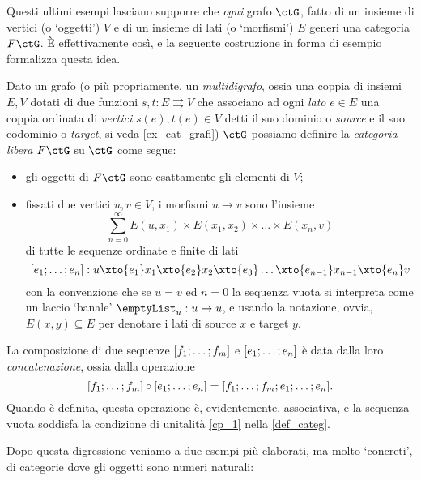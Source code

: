 Questi ultimi esempi lasciano supporre che \emph{ogni} grafo \(\ctG\), fatto di un insieme di vertici (o `oggetti') \(V\) e di un insieme di lati (o `morfismi') \(E\) generi una categoria \(F\ctG\). \`E effettivamente così, e la seguente costruzione in forma di esempio formalizza questa idea.
\begin{example}\label{ex_cat_libera}
	Dato un grafo (o più propriamente, un \emph{multidigrafo}, ossia una coppia di insiemi \(E,V\) dotati di due funzioni \(s,t : E\rightrightarrows V\) che associano ad ogni \emph{lato} \(e\in E\) una coppia ordinata di \emph{vertici} \(s(e),t(e)\in V\) detti il suo dominio o \emph{source} e il suo codominio o \emph{target}, si veda \ref{ex_cat_grafi}) \(\ctG\) possiamo definire la \emph{categoria libera} \(F\ctG\) su \(\ctG\) come segue:
	\begin{itemize}
		\item gli oggetti di \(F\ctG\) sono esattamente gli elementi di \(V\);
		\item fissati due vertici \(u,v\in V\), i morfismi \(u\to v\) sono l'insieme
		      \[\sum_{n=0}^\infty E(u,x_1)\times E(x_1,x_2)\times\dots\times E(x_n,v)\]
		      di tutte le sequenze ordinate e finite di lati
		      \[ [\tup en;] : u \xto{e_1} x_1 \xto{e_2} x_2\xto{e_3} \dots\xto{e_{n-1}} x_{n-1}\xto{e_n} v\]
		      con la convenzione che se \(u=v\) ed \(n=0\) la sequenza vuota si interpreta come un laccio `banale' \(\emptyList_u : u\to u\), e usando la notazione, ovvia, \(E(x,y)\subseteq E\) per denotare i lati di source \(x\) e target \(y\).
	\end{itemize}
	La composizione di due sequenze \([\tup fm;]\) e \([\tup en;]\) è data dalla loro \emph{concatenazione}, ossia dalla operazione
	\[[\tup fm;]\cmp[\tup en;] = [\tup fm;;\tup en;].\]
	Quando è definita, questa operazione è, evidentemente, associativa, e la sequenza vuota soddisfa la condizione di unitalità \ref{cp_1} nella \ref{def_categ}.
\end{example}
Dopo questa digressione veniamo a due esempi più elaborati, ma molto `concreti', di categorie dove gli oggetti sono numeri naturali:

